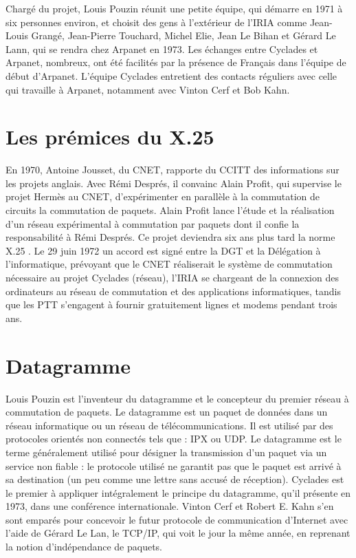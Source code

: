 \documentclass[12pt]{report}
\begin{document}
Chargé du projet, Louis Pouzin réunit une petite équipe, qui démarre en 1971 à six personnes environ, et choisit des gens à l’extérieur de l’IRIA comme Jean-Louis Grangé, Jean-Pierre Touchard, Michel Elie, Jean Le Bihan et Gérard Le Lann, qui se rendra chez Arpanet en 1973. Les échanges entre Cyclades et Arpanet, nombreux, ont été facilités par la présence de Français dans l'équipe de début d'Arpanet. L'équipe Cyclades entretient des contacts réguliers avec celle qui travaille à Arpanet, notamment avec Vinton Cerf et Bob Kahn.

\section{Les prémices du X.25}

En 1970, Antoine Jousset, du \gls{CNET}, rapporte du \gls{CCITT} des informations sur les projets anglais. Avec Rémi Després, il convainc Alain Profit, qui supervise le projet Hermès au CNET, d’expérimenter en parallèle à la commutation de circuits la commutation de paquets. Alain Profit lance l'étude et la réalisation d'un réseau expérimental à commutation par paquets dont il confie la responsabilité à Rémi Després. Ce projet deviendra six ans plus tard la norme X.25 \cite{wikicnet}. Le 29 juin 1972 un accord est signé entre la DGT et la Délégation à l’informatique, prévoyant que le CNET réaliserait le système de commutation nécessaire au projet Cyclades (réseau), l’IRIA se chargeant de la connexion des ordinateurs au réseau de commutation et des applications informatiques, tandis que les \gls{PTT} s’engagent à fournir gratuitement lignes et modems pendant trois ans.

\section{Datagramme}

Louis Pouzin est l'inventeur du datagramme et le concepteur du premier réseau à commutation de paquets.
Le datagramme est un paquet de données dans un réseau informatique ou un réseau de télécommunications. Il est utilisé par des protocoles orientés \og non connectés \fg tels que : IPX ou UDP. Le datagramme est le terme généralement utilisé pour désigner la transmission d'un paquet via un service non \og fiable \fg : le protocole utilisé ne garantit pas que le paquet est arrivé à sa destination (un peu comme une lettre sans accusé de réception). Cyclades est le premier à appliquer intégralement le principe du datagramme, qu'il présente en 1973, dans une conférence internationale. Vinton Cerf et Robert E. Kahn s'en sont emparés pour concevoir le futur protocole de communication d'Internet avec l'aide de Gérard Le Lan, le TCP/IP, qui voit le jour la même année, en reprenant la notion d'indépendance de paquets.
\end{document}
